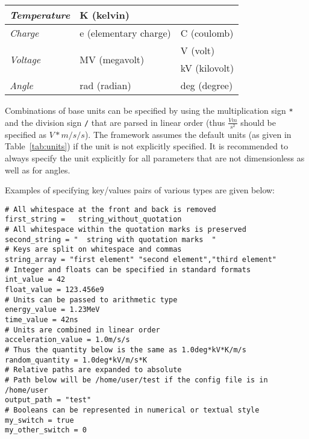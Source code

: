 \begin{table}[tbp]
\begin{tabular}{|l|l|l|}
\textit{Temperature}              & K (kelvin)                              &                          \\ \hline
\textit{Charge}                   & e (elementary charge)                   & C (coulomb)              \\ \hline
\multirow{2}{*}{\textit{Voltage}} & \multirow{2}{*}{MV (megavolt)}          & V (volt)                 \\ \cline{3-3}
                                  &                                         & kV (kilovolt)            \\ \hline
\textit{Angle}                    & rad (radian)                            & deg (degree)             \\ \hline
\end{tabular}
\end{table}

Combinations of base units can be specified by using the multiplication sign \texttt{*} and the division sign \texttt{/} that are parsed in linear order (thus $\frac{V m}{s^2}$ should be specified as $V*m/s/s$).
The framework assumes the default units (as given in Table~\ref{tab:units}) if the unit is not explicitly specified.
It is recommended to always specify the unit explicitly for all parameters that are not dimensionless as well as for angles.

Examples of specifying key/values pairs of various types are given below:
\begin{verbatim}
# All whitespace at the front and back is removed
first_string =   string_without_quotation
# All whitespace within the quotation marks is preserved
second_string = "  string with quotation marks  "
# Keys are split on whitespace and commas
string_array = "first element" "second element","third element"
# Integer and floats can be specified in standard formats
int_value = 42
float_value = 123.456e9
# Units can be passed to arithmetic type
energy_value = 1.23MeV
time_value = 42ns
# Units are combined in linear order
acceleration_value = 1.0m/s/s
# Thus the quantity below is the same as 1.0deg*kV*K/m/s
random_quantity = 1.0deg*kV/m/s*K
# Relative paths are expanded to absolute
# Path below will be /home/user/test if the config file is in /home/user
output_path = "test"
# Booleans can be represented in numerical or textual style
my_switch = true
my_other_switch = 0
\end{verbatim}

